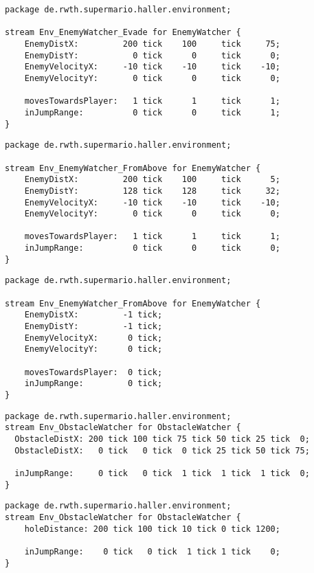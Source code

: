 \begin{lstlisting}[label=lst:enemywatchertest_1, caption=Enemy watcher stream test]
package de.rwth.supermario.haller.environment;

stream Env_EnemyWatcher_Evade for EnemyWatcher {
    EnemyDistX:         200 tick    100     tick     75;
    EnemyDistY:           0 tick      0     tick      0;
    EnemyVelocityX:     -10 tick    -10     tick    -10;
    EnemyVelocityY:       0 tick      0     tick      0;
            
    movesTowardsPlayer:   1 tick      1     tick      1;
    inJumpRange:          0 tick      0     tick      1;
}
\end{lstlisting}

\begin{lstlisting}[label=lst:enemywatchertest_2, caption=Enemy watcher stream test]
package de.rwth.supermario.haller.environment;

stream Env_EnemyWatcher_FromAbove for EnemyWatcher {
    EnemyDistX:         200 tick    100     tick      5;
    EnemyDistY:         128 tick    128     tick     32;
    EnemyVelocityX:     -10 tick    -10     tick    -10;
    EnemyVelocityY:       0 tick      0     tick      0;
            
    movesTowardsPlayer:   1 tick      1     tick      1;
    inJumpRange:          0 tick      0     tick      0;
}
\end{lstlisting}

\begin{lstlisting}[label=lst:enemywatchertest_3, caption=Enemy watcher stream test]
package de.rwth.supermario.haller.environment;

stream Env_EnemyWatcher_FromAbove for EnemyWatcher {
    EnemyDistX:         -1 tick;
    EnemyDistY:         -1 tick;
    EnemyVelocityX:      0 tick;
    EnemyVelocityY:      0 tick;
            
    movesTowardsPlayer:  0 tick;
    inJumpRange:         0 tick;
}
\end{lstlisting}

\begin{lstlisting}[label=lst:obstaclewatchertest, caption=Obstacle watcher stream test]
package de.rwth.supermario.haller.environment;
stream Env_ObstacleWatcher for ObstacleWatcher {
  ObstacleDistX: 200 tick 100 tick 75 tick 50 tick 25 tick  0;
  ObstacleDistX:   0 tick   0 tick  0 tick 25 tick 50 tick 75;
    
  inJumpRange:     0 tick   0 tick  1 tick  1 tick  1 tick  0;
}
\end{lstlisting}

\begin{lstlisting}[label=lst:holewatchertest, caption=Hole watcher stream test]
package de.rwth.supermario.haller.environment;
stream Env_ObstacleWatcher for ObstacleWatcher {
    holeDistance: 200 tick 100 tick 10 tick 0 tick 1200;
    
    inJumpRange:    0 tick   0 tick  1 tick	1 tick    0;
}
\end{lstlisting}